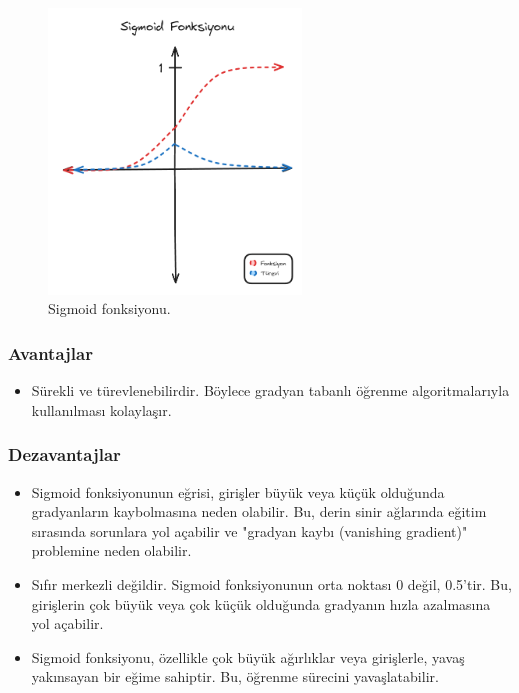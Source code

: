 \begin{figure}[h]
    \centering
    \includegraphics[width=0.6\textwidth]{images/sigmoid_function.png}
    \caption{Sigmoid fonksiyonu.}
    \label{fig:enter-label}
\end{figure}

\subsubsection{Avantajlar}
\begin{itemize}
    \item Sürekli ve türevlenebilirdir. Böylece gradyan tabanlı öğrenme algoritmalarıyla kullanılması kolaylaşır.
\end{itemize}

\subsubsection{Dezavantajlar}
\begin{itemize}
    \item Sigmoid fonksiyonunun eğrisi, girişler büyük veya küçük olduğunda gradyanların kaybolmasına neden olabilir. Bu, derin sinir ağlarında eğitim sırasında sorunlara yol açabilir ve "gradyan kaybı (vanishing gradient)" problemine neden olabilir.
    \item Sıfır merkezli değildir. Sigmoid fonksiyonunun orta noktası 0 değil, 0.5'tir. Bu, girişlerin çok büyük veya çok küçük olduğunda gradyanın hızla azalmasına yol açabilir.
    \item Sigmoid fonksiyonu, özellikle çok büyük ağırlıklar veya girişlerle, yavaş yakınsayan bir eğime sahiptir. Bu, öğrenme sürecini yavaşlatabilir.
\end{itemize}

